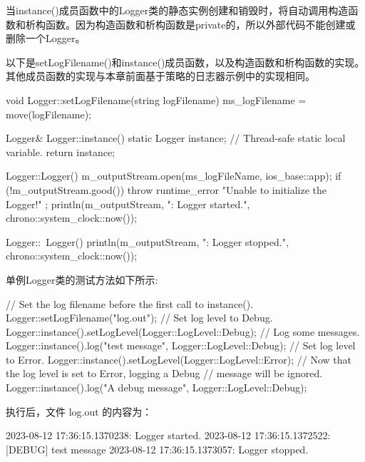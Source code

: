当instance()成员函数中的Logger类的静态实例创建和销毁时，将自动调用构造函数和析构函数。因为构造函数和析构函数是private的，所以外部代码不能创建或删除一个Logger。

以下是setLogFilename()和instance()成员函数，以及构造函数和析构函数的实现。其他成员函数的实现与本章前面基于策略的日志器示例中的实现相同。

\begin{cpp}
void Logger::setLogFilename(string logFilename)
{ ms_logFilename = move(logFilename); }

Logger& Logger::instance()
{
    static Logger instance; // Thread-safe static local variable.
    return instance;
}

Logger::Logger()
{
    m_outputStream.open(ms_logFileName, ios_base::app);
    if (!m_outputStream.good()) {
        throw runtime_error { "Unable to initialize the Logger!" };
    }
    println(m_outputStream, "{}: Logger started.", chrono::system_clock::now());
}


Logger::~Logger()
{ println(m_outputStream, "{}: Logger stopped.", chrono::system_clock::now()); }
\end{cpp}


单例Logger类的测试方法如下所示:

\begin{cpp}
// Set the log filename before the first call to instance().
Logger::setLogFilename("log.out");
// Set log level to Debug.
Logger::instance().setLogLevel(Logger::LogLevel::Debug);
// Log some messages.
Logger::instance().log("test message", Logger::LogLevel::Debug);
// Set log level to Error.
Logger::instance().setLogLevel(Logger::LogLevel::Error);
// Now that the log level is set to Error, logging a Debug
// message will be ignored.
Logger::instance().log("A debug message", Logger::LogLevel::Debug);
\end{cpp}

执行后，文件 log.out 的内容为：

\begin{shell}
2023-08-12 17:36:15.1370238: Logger started.
2023-08-12 17:36:15.1372522: [DEBUG] test message
2023-08-12 17:36:15.1373057: Logger stopped.
\end{shell}






















